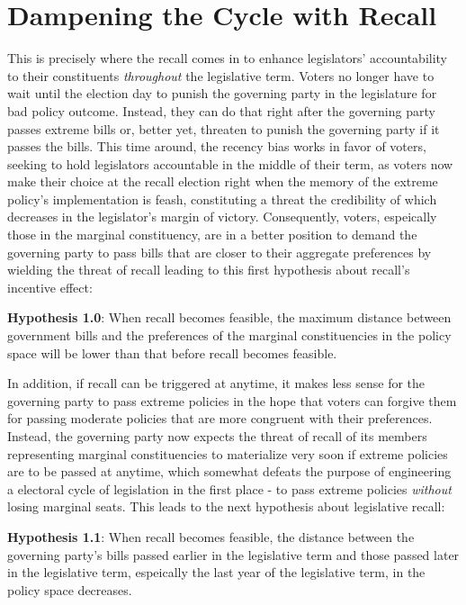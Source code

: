 \documentclass{article}
\begin{document}
		
	
	
	\section*{Dampening the Cycle with Recall}
		
		This is precisely where the recall comes in
		to enhance legislators' accountability to their constituents
		\textit{throughout} the legislative term.
		Voters no longer have to wait until the election day
		to punish the governing party in the legislature for bad policy outcome.
		Instead,
		they can do that right after the governing party passes extreme bills or,
		better yet,
		threaten to punish the governing party if it passes the bills.
		This time around,
		the recency bias works in favor of voters,
		seeking to hold legislators accountable in the middle of their term,
		as voters now make their choice at the recall election
		right when the memory of the extreme policy's implementation is feash,
		constituting a threat the credibility of which decreases in the
		legislator's margin of victory.
		Consequently,
		voters,
		espeically those in the marginal constituency,
		are in a better position to
		demand the governing party to pass bills that
		are closer to their aggregate preferences
		by wielding the threat of recall leading to this first hypothesis
		about recall's incentive effect:
		
		\textbf{Hypothesis 1.0}: When recall becomes feasible,
		the maximum distance between government bills
		and the preferences of the marginal constituencies in the policy space will be lower
		than that before recall becomes feasible.
		
		In addition,
		if recall can be triggered at anytime,
		it makes less sense
		for the governing party
		to pass extreme policies
		in the hope that
		voters can forgive them for passing moderate policies
		that are more congruent with their preferences.
		Instead,
		the governing party now expects the threat of recall 
		of its members representing marginal constituencies
		to materialize very soon if extreme policies are to be passed
		at anytime,
		which somewhat defeats the purpose of engineering a electoral cycle of legislation in the first place -
		to pass extreme policies \textit{without} losing marginal seats.
		This leads to the next hypothesis about legislative recall:
		
		\textbf{Hypothesis 1.1}: When recall becomes feasible,
		the distance between the governing party's bills passed earlier in the legislative term
		and those passed later in the legislative term,
		espeically the last year of the legislative term,
		in the policy space decreases.
		
\end{document}
